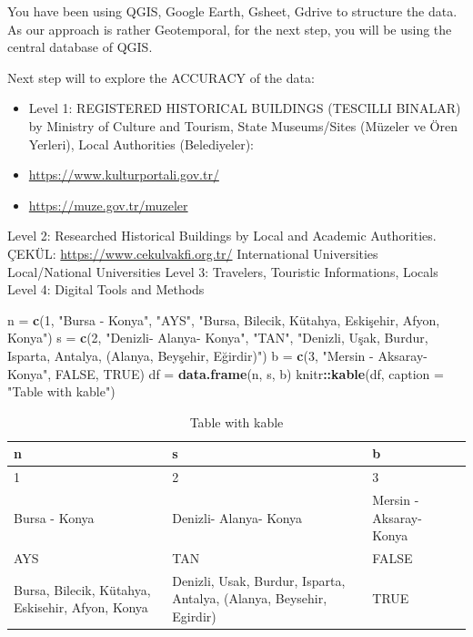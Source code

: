 \documentclass[
]{book}
\newenvironment{Shaded}{\begin{snugshade}}{\end{snugshade}}
\newcommand{\DataTypeTok}[1]{\textcolor[rgb]{0.13,0.29,0.53}{#1}}
\newcommand{\DecValTok}[1]{\textcolor[rgb]{0.00,0.00,0.81}{#1}}
\newcommand{\KeywordTok}[1]{\textcolor[rgb]{0.13,0.29,0.53}{\textbf{#1}}}
\newcommand{\NormalTok}[1]{#1}
\newcommand{\OperatorTok}[1]{\textcolor[rgb]{0.81,0.36,0.00}{\textbf{#1}}}
\newcommand{\OtherTok}[1]{\textcolor[rgb]{0.56,0.35,0.01}{#1}}
\newcommand{\StringTok}[1]{\textcolor[rgb]{0.31,0.60,0.02}{#1}}
\begin{document}
You have been using QGIS, Google Earth, Gsheet, Gdrive to structure the data. As our approach is rather Geotemporal, for the next step, you will be using the central database of QGIS.

Next step will to explore the ACCURACY of the data:

\begin{itemize}
\item
  Level 1: REGISTERED HISTORICAL BUILDINGS (TESCILLI BINALAR) by Ministry of Culture and Tourism, State Museums/Sites (Müzeler ve Ören Yerleri), Local Authorities (Belediyeler):
\item
  \url{https://www.kulturportali.gov.tr/}
\item
  \url{https://muze.gov.tr/muzeler}
\end{itemize}

Level 2: Researched Historical Buildings by Local and Academic Authorities.
ÇEKÜL: \url{https://www.cekulvakfi.org.tr/}
International Universities
Local/National Universities
Level 3: Travelers, Touristic Informations, Locals
Level 4: Digital Tools and Methods

\begin{Shaded}
\begin{Highlighting}[]
\NormalTok{n =}\StringTok{ }\KeywordTok{c}\NormalTok{(}\DecValTok{1}\NormalTok{, }\StringTok{"Bursa - Konya"}\NormalTok{, }\StringTok{"AYS"}\NormalTok{, }\StringTok{"Bursa, Bilecik, Kütahya, Eskişehir, Afyon, Konya"}\NormalTok{) }
\NormalTok{s =}\StringTok{ }\KeywordTok{c}\NormalTok{(}\DecValTok{2}\NormalTok{, }\StringTok{"Denizli- Alanya- Konya"}\NormalTok{, }\StringTok{"TAN"}\NormalTok{, }\StringTok{"Denizli, Uşak, Burdur, Isparta, Antalya, (Alanya, Beyşehir, Eğirdir)"}\NormalTok{) }
\NormalTok{b =}\StringTok{ }\KeywordTok{c}\NormalTok{(}\DecValTok{3}\NormalTok{, }\StringTok{"Mersin - Aksaray- Konya"}\NormalTok{, }\OtherTok{FALSE}\NormalTok{, }\OtherTok{TRUE}\NormalTok{) }
\NormalTok{df =}\StringTok{ }\KeywordTok{data.frame}\NormalTok{(n, s, b) }
\NormalTok{knitr}\OperatorTok{::}\KeywordTok{kable}\NormalTok{(df, }\DataTypeTok{caption =} \StringTok{"Table with kable"}\NormalTok{)}
\end{Highlighting}
\end{Shaded}

\begin{table}

\caption{\label{tab:unnamed-chunk-3}Table with kable}
\centering
\begin{tabular}[t]{l|l|l}
\hline
n & s & b\\
\hline
1 & 2 & 3\\
\hline
Bursa - Konya & Denizli- Alanya- Konya & Mersin - Aksaray- Konya\\
\hline
AYS & TAN & FALSE\\
\hline
Bursa, Bilecik, Kütahya, Eskisehir, Afyon, Konya & Denizli, Usak, Burdur, Isparta, Antalya, (Alanya, Beysehir, Egirdir) & TRUE\\
\hline
\end{tabular}
\end{table}
\end{document}
